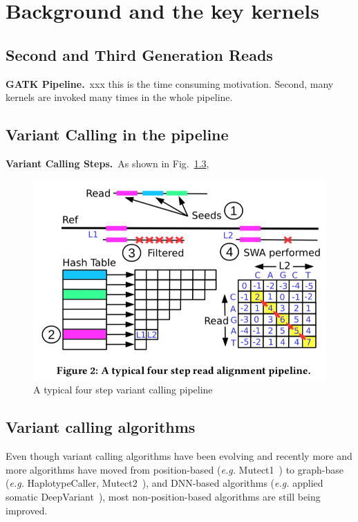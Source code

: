 \section{Background and the key kernels}

\subsection{Second and Third Generation Reads}
\textbf{GATK Pipeline.}~xxx this is the time consuming motivation. Second, many kernels are invoked many times in the whole pipeline.

\subsection{Variant Calling in the pipeline}
\textbf{Variant Calling Steps.}~As shown in Fig.~\ref{}, 

\begin{figure}[htbp]
\centering
\includegraphics[scale=0.32]{fig/demo-steps.png}
\caption{A typical four step variant calling pipeline}
\label{fig:arch_design}
\end{figure}

\subsection{Variant calling algorithms}
Even though variant calling algorithms have been evolving and recently more and more algorithms have moved from position-based (\textit{e.g.} Mutect1~\cite{}) to graph-base (\textit{e.g.} HaplotypeCaller, Mutect2~\cite{}), and DNN-based algorithms (\textit{e.g.} applied somatic DeepVariant~\cite{}), most non-position-based algorithms are still being improved. 

